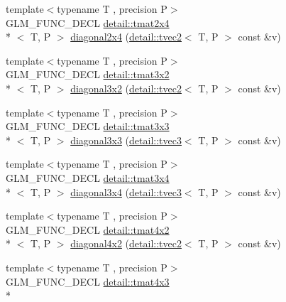 \begin{DoxyCompactItemize}
\item 
{\footnotesize template$<$typename T , precision P$>$ }\\G\-L\-M\-\_\-\-F\-U\-N\-C\-\_\-\-D\-E\-C\-L \hyperlink{structglm_1_1detail_1_1tmat2x4}{detail\-::tmat2x4}\\*
$<$ T, P $>$ \hyperlink{group__gtx__matrix__operation_gaf97e094855cc3c6186b879d045f67aca}{diagonal2x4} (\hyperlink{structglm_1_1detail_1_1tvec2}{detail\-::tvec2}$<$ T, P $>$ const \&v)
\item 
{\footnotesize template$<$typename T , precision P$>$ }\\G\-L\-M\-\_\-\-F\-U\-N\-C\-\_\-\-D\-E\-C\-L \hyperlink{structglm_1_1detail_1_1tmat3x2}{detail\-::tmat3x2}\\*
$<$ T, P $>$ \hyperlink{group__gtx__matrix__operation_gabf8e8445e2884aeaa35f0ec32ba5bd01}{diagonal3x2} (\hyperlink{structglm_1_1detail_1_1tvec2}{detail\-::tvec2}$<$ T, P $>$ const \&v)
\item 
{\footnotesize template$<$typename T , precision P$>$ }\\G\-L\-M\-\_\-\-F\-U\-N\-C\-\_\-\-D\-E\-C\-L \hyperlink{structglm_1_1detail_1_1tmat3x3}{detail\-::tmat3x3}\\*
$<$ T, P $>$ \hyperlink{group__gtx__matrix__operation_gaa49be0f424ad2f3015c5945c13a5fad0}{diagonal3x3} (\hyperlink{structglm_1_1detail_1_1tvec3}{detail\-::tvec3}$<$ T, P $>$ const \&v)
\item 
{\footnotesize template$<$typename T , precision P$>$ }\\G\-L\-M\-\_\-\-F\-U\-N\-C\-\_\-\-D\-E\-C\-L \hyperlink{structglm_1_1detail_1_1tmat3x4}{detail\-::tmat3x4}\\*
$<$ T, P $>$ \hyperlink{group__gtx__matrix__operation_gab96c533557a191bd972300868f8111ef}{diagonal3x4} (\hyperlink{structglm_1_1detail_1_1tvec3}{detail\-::tvec3}$<$ T, P $>$ const \&v)
\item 
{\footnotesize template$<$typename T , precision P$>$ }\\G\-L\-M\-\_\-\-F\-U\-N\-C\-\_\-\-D\-E\-C\-L \hyperlink{structglm_1_1detail_1_1tmat4x2}{detail\-::tmat4x2}\\*
$<$ T, P $>$ \hyperlink{group__gtx__matrix__operation_ga1ec0fc953d871fc9894bcfcc81dbaf68}{diagonal4x2} (\hyperlink{structglm_1_1detail_1_1tvec2}{detail\-::tvec2}$<$ T, P $>$ const \&v)
\item 
{\footnotesize template$<$typename T , precision P$>$ }\\G\-L\-M\-\_\-\-F\-U\-N\-C\-\_\-\-D\-E\-C\-L \hyperlink{structglm_1_1detail_1_1tmat4x3}{detail\-::tmat4x3}\\*

\end{DoxyCompactItemize}
